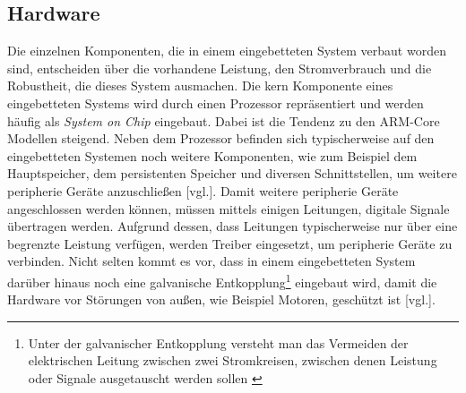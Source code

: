 \subsection{Hardware}
\label{subsec:EmbeddedHardware}
Die einzelnen Komponenten, die in einem eingebetteten System verbaut worden sind, entscheiden über
die vorhandene Leistung, den Stromverbrauch und die Robustheit, die dieses System ausmachen. Die
kern Komponente eines eingebetteten Systems wird durch einen Prozessor repräsentiert und
werden häufig als \emph{System on Chip} eingebaut. Dabei ist die Tendenz zu den ARM-Core Modellen
steigend. Neben dem Prozessor befinden sich typischerweise auf den eingebetteten Systemen noch
weitere Komponenten, wie zum Beispiel dem Hauptspeicher, dem persistenten Speicher und diversen
Schnittstellen, um weitere peripherie Geräte anzuschließen \cite{EmbeddedLinuxQuade}[vgl.].
\newline
\newline
Damit weitere peripherie Geräte angeschlossen werden können, müssen mittels einigen Leitungen,
digitale Signale übertragen werden. Aufgrund dessen, dass Leitungen typischerweise nur über eine
begrenzte Leistung verfügen, werden Treiber eingesetzt, um peripherie Geräte zu verbinden.
Nicht selten kommt es vor, dass in einem eingebetteten System darüber hinaus noch eine galvanische
Entkopplung\footnote{Unter der galvanischer Entkopplung versteht man das Vermeiden der
elektrischen Leitung zwischen zwei Stromkreisen, zwischen denen Leistung oder Signale
ausgetauscht werden sollen \cite{galvanischeEntkopplungErklaert}} eingebaut wird, damit die Hardware
vor Störungen von außen, wie Beispiel Motoren, geschützt ist \cite{EmbeddedLinuxQuade}[vgl.].